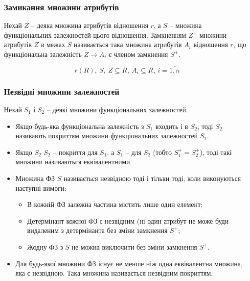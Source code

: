 \subsubsection{Замикання множини атрибутів}

Нехай $Z$ -- деяка множина атрибутів відношення $r$, а $S$ -- множина функціональних залежностей цього відношення. Замкненням ${{Z}^{+}}$ множини атрибутів $Z$ в межах $S$ називається така множина атрибутів ${{A}_{i}}$ відношення $r$, що функціональна залежність $Z\to {{A}_{i}}$ є членом замкнення ${{S}^{+}}$.

\[ r\left(R\right),\ S,\ Z\subseteq R,\ {{A}_{i}}\subseteq R,\ i={\overline {1,n}} \]

\subsubsection{Незвідні множини залежностей}

Нехай ${{S}_{1}}$ і ${{S}_{2}}$ -- деякі множини функціональних залежностей.

\begin{itemize}
	\item Якщо будь-яка функціональна залежність з ${{S}_{1}}$ входить і в ${{S}_{2}}$, тоді ${{S}_{2}}$ називають покриттям множини функціональних залежностей ${{S}_{1}}$.

	\item Якщо ${{S}_{2}}$ ${{S}_{2}}$ -- покриття для ${{S}_{1}}$, а ${{S}_{1}}$ -- для ${{S}_{2}}$ (тобто $S_{1}^{+}=S_{2}^{+}$), тоді такі множини називаються еквівалентними.

	\item Множина ФЗ $S$ називається незвідною тоді і тільки тоді, коли виконуються наступні вимоги:
	\begin{itemize}
		\item В кожній ФЗ залежна частина містить лише один елемент;

		\item Детермінант кожної ФЗ є незвідним (ні один атрибут не може буди видаленим з детермінанта без зміни замкнення ${{S}^{+}}$;

		\item Жодну ФЗ з $S$ не можна виключити без зміни замкнення ${{S}^{+}}$.
	\end{itemize}
	
	\item Для будь-якої множини ФЗ існує не менше ніж одна еквівалентна множина, яка є незвідною. Така множина називається незвідним покриттям.
\end{itemize}


